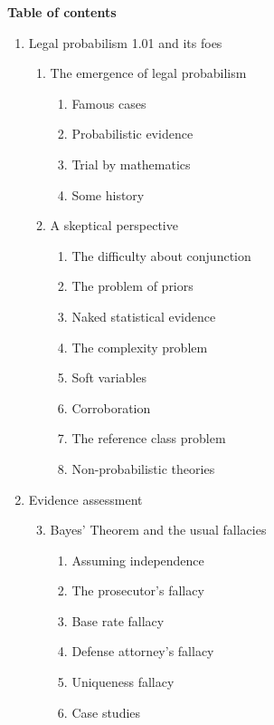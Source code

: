 \documentclass[10pt,dvipsnames,enabledeprecatedfontcommands]{scrartcl}
\begin{document}
\vspace{3mm}

\noindent \textbf{Table of contents}

\renewcommand{\labelenumi}{\Roman{enumi}}
\renewcommand{\labelenumii}{\arabic{enumii}}
\renewcommand{\labelenumiii}{\arabic{enumii}.\arabic{enumiii}}

\begin{enumerate}
\item Legal probabilism 1.01 and its foes
\begin{enumerate}

  \item The emergence of legal probabilism
  \begin{enumerate}
  \item  Famous cases
  \item  Probabilistic evidence
  \item  Trial by mathematics
  \item  Some history
  \end{enumerate}
  

  
  \item  A skeptical perspective
  \begin{enumerate}
  \item  The difficulty about conjunction
  \item  The problem of priors
  \item  Naked statistical evidence
  \item  The complexity problem
  \item  Soft variables
  \item  Corroboration
  \item  The reference class problem
  \item  Non-probabilistic theories
  \end{enumerate}


\end{enumerate}
\item  Evidence assessment


\begin{enumerate}


\setcounter{enumii}{2}
  \item  Bayes' Theorem and the usual fallacies
  \begin{enumerate}
  \item  Assuming independence
  \item  The prosecutor's fallacy
  \item  Base rate fallacy
  \item  Defense attorney's fallacy
  \item  Uniqueness fallacy
  \item  Case studies
  \end{enumerate}


\end{enumerate}
\end{enumerate}
\end{document}
